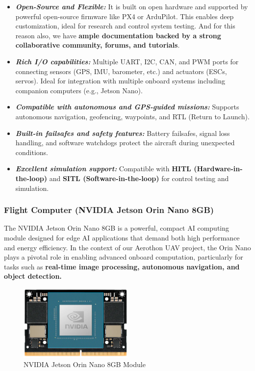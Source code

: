 \documentclass[12pt]{report}
\begin{document}
      \begin{itemize}
        \item \textbf{\textit{Open-Source and Flexible:}} It is built on open hardware and supported by powerful open-source firmware like PX4 or ArduPilot. This enables deep customization, ideal for research and control system testing. And for this reason also, we have \textbf{ample documentation backed by a strong collaborative community, forums, and tutorials}.
        \item \textbf{\textit{Rich I/O capabilities:}} Multiple UART, I2C, CAN, and PWM ports for connecting sensors (GPS, IMU, barometer, etc.) and actuators (ESCs, servos). Ideal for integration with multiple onboard systems including companion computers (e.g., Jetson Nano).
        \item \textbf{\textit{Compatible with autonomous and GPS-guided missions:}}  Supports autonomous navigation, geofencing, waypoints, and RTL (Return to Launch).
        \item \textbf{\textit{Built-in failsafes and safety features:}} Battery failsafes, signal loss handling, and software watchdogs protect the aircraft during unexpected conditions.
        \item \textbf{\textit{Excellent simulation support:}} Compatible with \textbf{HITL (Hardware-in-the-loop)} and \textbf{SITL (Software-in-the-loop)} for control testing and simulation.
      \end{itemize}
      
      \subsubsection{\large Flight Computer (NVIDIA Jetson Orin Nano 8GB)}
      The NVIDIA Jetson Orin Nano 8GB is a powerful, compact AI computing module designed for edge AI applications that demand both high performance and energy efficiency. In the context of our Aerothon UAV project, the Orin Nano plays a pivotal role in enabling advanced onboard computation, particularly for tasks such as \textbf{real-time image processing, autonomous navigation, and object detection.} \\

      \begin{figure}[H]
        \centering 
        \includegraphics[width=0.5\textwidth]{jetson.png}
        \caption{NVIDIA Jetson Orin Nano 8GB Module}
        \label{fig:jetson}
      \end{figure}
\end{document}
